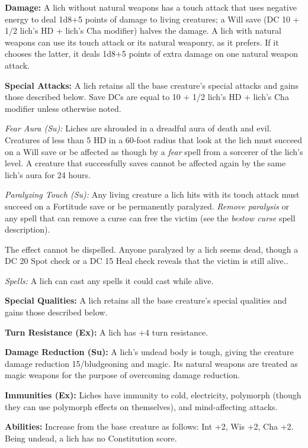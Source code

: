 \documentclass{article}
\begin{document}
\textbf{Damage:} A lich without natural weapons has a touch attack that uses negative 
energy to deal 1d8+5 points of damage to living creatures; a Will save (DC 10 + 
1/2 lich's HD + lich's Cha modifier) halves the damage. A lich with natural weapons 
can use its touch attack or its natural weaponry, as it prefers. If it chooses 
the latter, it deals 1d8+5 points of extra damage on one natural weapon attack.

\textbf{Special Attacks:} A lich retains all the base creature's special attacks 
and gains those described below. Save DCs are equal to 10 + 1/2 lich's HD + lich's 
Cha modifier unless otherwise noted.

\textit{Fear Aura (Su): }Liches are shrouded in a dreadful aura of death and evil. 
Creatures of less than 5 HD in a 60-foot radius that look at the lich must succeed 
on a Will save or be affected as though by a \textit{fear }spell from a sorcerer 
of the lich's level. A creature that successfully saves cannot be affected again 
by the same lich's aura for 24 hours.

\textit{Paralyzing Touch (Su): }Any living creature a lich hits with its touch 
attack must succeed on a Fortitude save or be permanently paralyzed. \textit{Remove 
paralysis }or any spell that can remove a curse can free the victim (see the \textit{bestow 
curse }spell description).

The effect cannot be dispelled. Anyone paralyzed by a lich seems dead, though a 
DC 20 Spot check or a DC 15 Heal check reveals that the victim is still alive..

\textit{Spells: }A lich can cast any spells it could cast while alive.

\textbf{Special Qualities:} A lich retains all the base creature's special qualities 
and gains those described below.

\textbf{Turn Resistance (Ex):} A lich has +4 turn resistance. 

\textbf{Damage Reduction (Su):} A lich's undead body is tough, giving the creature 
damage reduction 15/bludgeoning and magic. Its natural weapons are treated as magic 
weapons for the purpose of overcoming damage reduction.

\textbf{Immunities (Ex):} Liches have immunity to cold, electricity, polymorph 
(though they can use polymorph effects on themselves), and mind-affecting attacks.

\textbf{Abilities:} Increase from the base creature as follows: Int +2, Wis +2, 
Cha +2. Being undead, a lich has no Constitution score.
\end{document}
